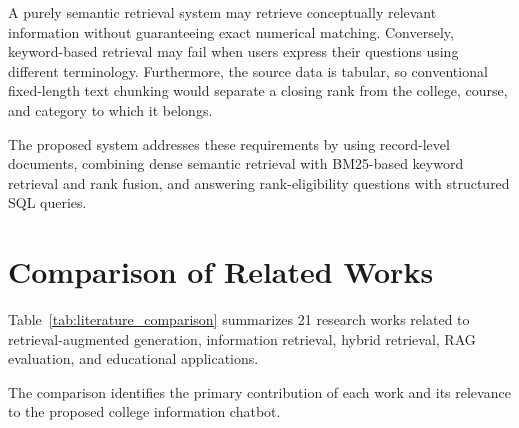 \documentclass[conference]{IEEEtran}
\begin{document}
A purely semantic retrieval system may retrieve
conceptually relevant information without guaranteeing
exact numerical matching. Conversely, keyword-based
retrieval may fail when users express their questions
using different terminology. Furthermore, the source
data is tabular, so conventional fixed-length text
chunking would separate a closing rank from the college,
course, and category to which it belongs.

The proposed system addresses these requirements
by using record-level documents, combining dense
semantic retrieval with BM25-based keyword retrieval
and rank fusion, and answering rank-eligibility
questions with structured SQL queries.

\section{Comparison of Related Works}

Table~\ref{tab:literature_comparison} summarizes
21 research works related to retrieval-augmented
generation, information retrieval, hybrid retrieval,
RAG evaluation, and educational applications.

The comparison identifies the primary contribution
of each work and its relevance to the proposed
college information chatbot.
\end{document}

